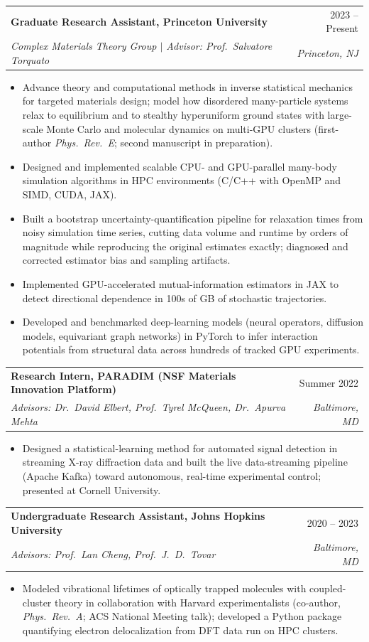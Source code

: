 \documentclass[letterpaper,10pt]{article}
\makeatletter
\newcommand{\resumeItem}[1]{\item\small{{#1 \vspace{-2pt}}}}
\newcommand{\resumeSubheading}[4]{
  \vspace{-2pt}\item
    \begin{tabular*}{0.97\textwidth}[t]{l@{\extracolsep{\fill}}r}
      \textbf{#1} & #2 \\
      \textit{\small#3} & \textit{\small #4} \\
    \end{tabular*}\vspace{-7pt}
}
\newcommand{\resumeItemListStart}{\begin{itemize}[itemsep=0pt, topsep=2pt]}
\newcommand{\resumeItemListEnd}{\end{itemize}\vspace{-5pt}}
\makeatother
\begin{document}
    \resumeSubheading
      {Graduate Research Assistant, Princeton University}{2023 -- Present}
      {\textnormal{Complex Materials Theory Group $\mid$ Advisor: Prof.\ Salvatore Torquato}}{Princeton, NJ}
      \resumeItemListStart
        \resumeItem{Advance theory and computational methods in inverse statistical mechanics for targeted materials design; model how disordered many-particle systems relax to equilibrium and to stealthy hyperuniform ground states with large-scale Monte Carlo and molecular dynamics on multi-GPU clusters (first-author \emph{Phys.\ Rev.\ E}; second manuscript in preparation).}
        \resumeItem{Designed and implemented scalable CPU- and GPU-parallel many-body simulation algorithms in HPC environments (C/C++ with OpenMP and SIMD, CUDA, JAX).}
        \resumeItem{Built a bootstrap uncertainty-quantification pipeline for relaxation times from noisy simulation time series, cutting data volume and runtime by orders of magnitude while reproducing the original estimates exactly; diagnosed and corrected estimator bias and sampling artifacts.}
        \resumeItem{Implemented GPU-accelerated mutual-information estimators in JAX to detect directional dependence in 100s of GB of stochastic trajectories.}
        \resumeItem{Developed and benchmarked deep-learning models (neural operators, diffusion models, equivariant graph networks) in PyTorch to infer interaction potentials from structural data across hundreds of tracked GPU experiments.}
      \resumeItemListEnd

    \resumeSubheading
      {Research Intern, PARADIM (NSF Materials Innovation Platform)}{Summer 2022}
      {\textnormal{Advisors: Dr.\ David Elbert, Prof.\ Tyrel McQueen, Dr.\ Apurva Mehta}}{Baltimore, MD}
      \resumeItemListStart
        \resumeItem{Designed a statistical-learning method for automated signal detection in streaming X-ray diffraction data and built the live data-streaming pipeline (Apache Kafka) toward autonomous, real-time experimental control; presented at Cornell University.}
      \resumeItemListEnd

    \resumeSubheading
      {Undergraduate Research Assistant, Johns Hopkins University}{2020 -- 2023}
      {\textnormal{Advisors: Prof.\ Lan Cheng, Prof.\ J.\ D.\ Tovar}}{Baltimore, MD}
      \resumeItemListStart
        \resumeItem{Modeled vibrational lifetimes of optically trapped molecules with coupled-cluster theory in collaboration with Harvard experimentalists (co-author, \emph{Phys.\ Rev.\ A}; ACS National Meeting talk); developed a Python package quantifying electron delocalization from DFT data run on HPC clusters.}
      \resumeItemListEnd
\end{document}
